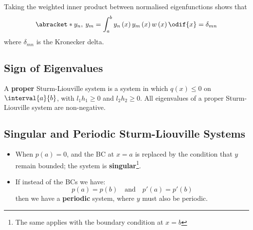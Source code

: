 \documentclass{article}
\begin{document}
Taking the weighted inner product between normalised eigenfunctions
shows that
\begin{equation*}
    \abracket*{y_n,\: y_m} = \int_a^b y_n\left( x \right) y_m\left( x \right) w\left( x \right) \odif{x} = \delta_{mn}
\end{equation*}
where \(\delta_{mn}\) is the Kronecker delta.
\subsection{Sign of Eigenvalues}
A \textbf{proper} Sturm-Liouville system is a system in which \(q\left(
x \right) \leqslant 0\) on \(\interval{a}{b}\), with \(l_1h_1 \geqslant
0\) and \(l_2h_2 \geqslant 0\). All eigenvalues of a proper
Sturm-Liouville system are non-negative.
\subsection{Singular and Periodic Sturm-Liouville Systems}
\begin{itemize}
    \item When \(p\left( a \right) = 0\), and the BC at \(x = a\) is
          replaced by the condition that \(y\) remain bounded; the
          system is \textbf{singular}\footnote{The same applies with
          the boundary condition at \(x = b\)}.
    \item If instead of the BCs we have:
          \begin{equation*}
              p\left( a \right) = p\left( b \right) \quad \text{and} \quad p'\left( a \right) = p'\left( b \right)
          \end{equation*}
          then we have a \textbf{periodic} system, where \(y\) must also be periodic.
\end{itemize}
\end{document}
